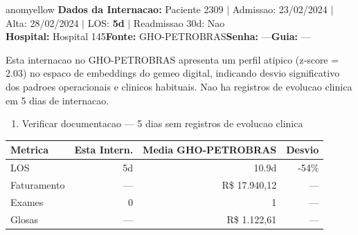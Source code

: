 \documentclass[a4paper,10pt]{article}
\begin{document}
\begin{anomalycard}[Internacao 81338 | GHO-PETROBRAS | MODERADO (z=2.03)]{anomyellow}
\textbf{Dados da Internacao:} Paciente 2309 $\mid$ Admissao: 23/02/2024 $\mid$ Alta: 28/02/2024 $\mid$ LOS: \textbf{5d} $\mid$ Readmissao 30d: Nao\\
\textbf{Hospital:} Hospital 145\quad\textbf{Fonte:} GHO-PETROBRAS\quad\textbf{Senha:} ---\quad\textbf{Guia:} ---\\
\vspace{2pt}\begin{tcolorbox}[colback=severityred!20,colframe=anomyellow,title={\textbf{Interpretacao de Negocio}},fonttitle=\bfseries\small,left=4pt,right=4pt,top=3pt,bottom=3pt]
{\small Esta internacao no GHO-PETROBRAS apresenta um perfil atipico (z-score = 2.03) no espaco de embeddings do gemeo digital, indicando desvio significativo dos padroes operacionais e clinicos habituais. Nao ha registros de evolucao clinica em 5 dias de internacao.}
\end{tcolorbox}
\begin{tcolorbox}[colback=severityyellow!30,colframe=anomorange,title={\textbf{Recomendacoes Especificas}},fonttitle=\bfseries\small,left=4pt,right=4pt,top=3pt,bottom=3pt]
\begin{enumerate}[nosep,leftmargin=16pt]
\item {\small Verificar documentacao --- 5 dias sem registros de evolucao clinica}
\end{enumerate}
\end{tcolorbox}
\begin{center}\begin{tabular}{l r r r}\toprule\textbf{Metrica} & \textbf{Esta Intern.} & \textbf{Media GHO-PETROBRAS} & \textbf{Desvio} \\\midrule
LOS & 5d & 10.9d & -54\% \\
Faturamento & --- & R\$ 17.940,12 & --- \\
Exames & 0 & 1 & --- \\
Glosas & --- & R\$ 1.122,61 & --- \\
\bottomrule\end{tabular}\end{center}


\end{anomalycard}
\end{document}
